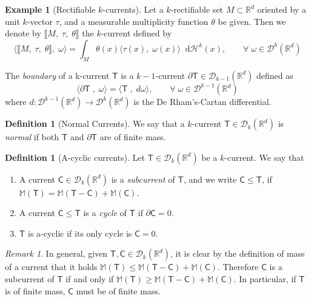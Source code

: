 \documentclass[11pt, twoside, reqno]{amsart}
\theoremstyle{definition}
\newtheorem{exmp}[thm]{Example}
\newtheorem{defi}[thm]{Definition}
\theoremstyle{remark}
\newtheorem{remark}[thm]{Remark}
\numberwithin{equation}{section}
\newcommand*\dif{\mathop{}\!\mathrm{d}}
\newcommand{\ms}[1]{\mathsf{#1}}
\newcommand{\msc}[1]{\mathscr{#1}}
\begin{document}
\begin{exmp}[Rectifiable $k$-currents]
Let  a $k$-rectifiable set $M \subset \mathbb R^d$ oriented by a unit $k$-vector $\tau$, and a measurable  multiplicity function $\theta$ be given. Then we denote by $\llbracket M ,\; \tau, \; \theta\rrbracket$ the $k$-current defined by 
$$
\langle \llbracket M ,\; \tau, \; \theta\rrbracket, \; \omega \rangle = \int_M \theta(x)\langle \tau(x), \; \omega(x) \rangle \dif \msc H^k(x), \qquad \forall \; \omega \in \msc D^k(\mathbb R^d)
$$
\end{exmp}
The \textit{boundary} of a k-current $\ms T$ is a $k-1$-current $\partial \ms T \in \mathscr D_{k-1}(\mathbb R^d)$ defined as
$$
\langle \partial \ms T \; , \; \omega\rangle = \langle \ms T \; , \; d \omega\rangle, \qquad \forall \; \omega \in \mathscr D^{k-1}(\mathbb R^d)
$$
where $d : \mathscr D^{k-1}(\mathbb R^d) \to \mathscr D^{k}(\mathbb R^d)$ is the De Rham's-Cartan differential.

\begin{defi}[Normal Currents]
We say that a $k$-current $\ms T \in \mathscr D_{k}(\mathbb R^d)$ is \textit{normal} if both $\ms T$ and $\partial \ms T$ are of finite mass. 
\end{defi}


\begin{defi}[A-cyclic currents]
    Let $\ms T \in  \msc D_k(\mathbb R^d)$ be a $k$-current. We say that 
\begin{enumerate}
    \item A current $\ms C \in \msc D_k(\mathbb R^d)$ is a \textit{subcurrent} of $\ms T$, and we write $\ms C \leq \ms T$, if $\mathbb M (\ms T) = \mathbb M (\ms T-\ms C) +\mathbb M (\ms C)$.
    \item A current $\ms C \leq \ms T$ is a \textit{cycle} of $ \ms T$ if $\partial \ms C = 0$.
    \item $\ms T$ is a-cyclic if its only cycle is $\ms C = 0$.
\end{enumerate}
\end{defi}

\begin{remark}
    In general, given $\ms T, \ms C \in \msc D_k(\mathbb R^d)$, it is clear by the definition of mass of a current that it holds $\mathbb M (\ms T) \leq \mathbb M (\ms T-\ms C) +\mathbb M (\ms C)$. Therefore $\ms C$ is a subcurrent of $\ms T$ if and only if $\mathbb M (\ms T) \geq \mathbb M (\ms T-\ms C) +\mathbb M (\ms C)$. In particular, if $\ms T$ is of finite mass, $\ms C$  must be of finite mass.
\end{remark}
\end{document}
